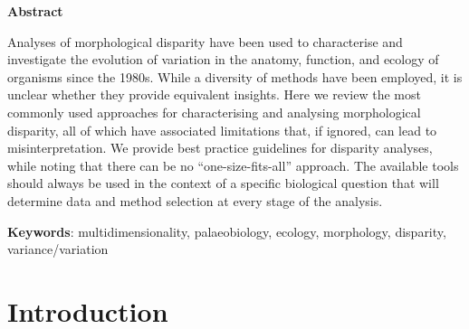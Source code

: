 \documentclass[12pt,letterpaper]{article}
\begin{document}
\modulolinenumbers[1]
\linenumbers

\textbf{Abstract}

\noindent Analyses of morphological disparity have been used to characterise and investigate the evolution of variation in the anatomy, function, and ecology of organisms since the 1980s.
While a diversity of methods have been employed, it is unclear whether they provide equivalent insights.
Here we review the most commonly used approaches for characterising and analysing morphological disparity, all of which have associated limitations that, if ignored, can lead to misinterpretation.
We provide best practice guidelines for disparity analyses, while noting that there can be no ``one-size-fits-all'' approach.
The available tools should always be used in the context of a specific biological question that will determine data and method selection at every stage of the analysis.
 
\textbf{Keywords}: multidimensionality, palaeobiology, ecology, morphology, disparity, variance/variation

\section{Introduction}
\end{document}
